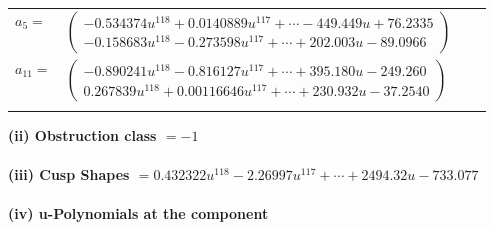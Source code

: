\documentclass[1p]{elsarticle_modified}
\theoremstyle{definition}
\begin{document}
\begin{tabular}{m{7pt} m{180pt} m{7pt} m{180pt} }
\flushright $a_{5}=$&$\begin{pmatrix}-0.534374 u^{118}+0.0140889 u^{117}+\cdots-449.449 u+76.2335\\-0.158683 u^{118}-0.273598 u^{117}+\cdots+202.003 u-89.0966\end{pmatrix}$ \\
\flushright $a_{11}=$&$\begin{pmatrix}-0.890241 u^{118}-0.816127 u^{117}+\cdots+395.180 u-249.260\\0.267839 u^{118}+0.00116646 u^{117}+\cdots+230.932 u-37.2540\end{pmatrix}$\\&\end{tabular}
\flushleft \textbf{(ii) Obstruction class $= -1$}\\~\\
\flushleft \textbf{(iii) Cusp Shapes $= 0.432322 u^{118}-2.26997 u^{117}+\cdots+2494.32 u-733.077$}\\~\\
\newpage\renewcommand{\arraystretch}{1}
\flushleft \textbf{(iv) u-Polynomials at the component}\newline \\
\end{document}
